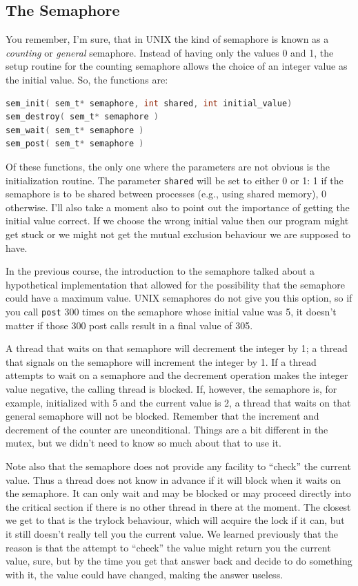 \subsection*{The Semaphore}

You remember, I'm sure, that in UNIX the kind of semaphore is known as a \textit{counting} or \textit{general} semaphore. Instead of having only the values 0 and 1, the setup routine for the counting semaphore allows the choice of an integer value as the initial value. So, the functions are:

\begin{lstlisting}[language=C]
sem_init( sem_t* semaphore, int shared, int initial_value)
sem_destroy( sem_t* semaphore )
sem_wait( sem_t* semaphore )
sem_post( sem_t* semaphore )
\end{lstlisting}

Of these functions, the only one where the parameters are not obvious is the initialization routine. The parameter \texttt{shared} will be set to either 0 or 1: 1 if the semaphore is to be shared between processes (e.g., using shared memory), 0 otherwise. I'll also take a moment also to point out the importance of getting the initial value correct. If we choose the wrong initial value then our program might get stuck or we might not get the mutual exclusion behaviour we are supposed to have.

In the previous course, the introduction to the semaphore talked about a hypothetical implementation that allowed for the possibility that the semaphore could have a maximum value. UNIX semaphores do not give you this option, so if you call \texttt{post} 300 times on the semaphore whose initial value was 5, it doesn't matter if those 300 post calls result in a final value of 305.

A thread that waits on that semaphore will decrement the integer by 1; a thread that signals on the semaphore will increment the integer by 1. If a thread attempts to wait on a semaphore and the decrement operation makes the integer value negative, the calling thread is blocked. If, however, the semaphore is, for example, initialized with 5 and the current value is 2, a thread that waits on that general semaphore will not be blocked. Remember that the increment and decrement of the counter are unconditional. Things are a bit different in the mutex, but we didn't need to know so much about that to use it.

Note also that the semaphore does not provide any facility to ``check'' the current value. Thus a thread does not know in advance if it will block when it waits on the semaphore. It can only wait and may be blocked or may proceed directly into the critical section if there is no other thread in there at the moment. The closest we get to that is the trylock behaviour, which will acquire the lock if it can, but it still doesn't really tell you the current value. We learned previously that the reason is that the attempt to ``check'' the value might return you the current value, sure, but by the time you get that answer back and decide to do something with it, the value could have changed, making the answer useless.

